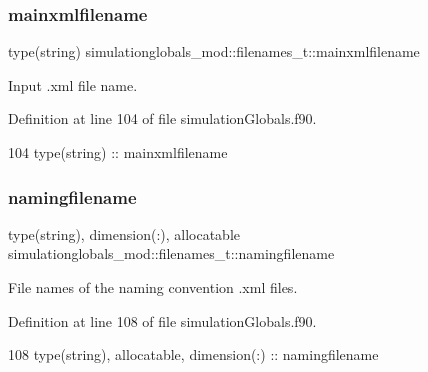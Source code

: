 \subsubsection{\texorpdfstring{mainxmlfilename}{mainxmlfilename}}
{\footnotesize\ttfamily type(string) simulationglobals\+\_\+mod\+::filenames\+\_\+t\+::mainxmlfilename\hspace{0.3cm}{\ttfamily [private]}}



Input .xml file name. 



Definition at line 104 of file simulation\+Globals.\+f90.


\begin{DoxyCode}
104         \textcolor{keywordtype}{type}(string) :: mainxmlfilename
\end{DoxyCode}
\mbox{\label{structsimulationglobals__mod_1_1filenames__t_ab9bfe3490032ac0fe0ff585f4ccf81ba}} 
\subsubsection{\texorpdfstring{namingfilename}{namingfilename}}
{\footnotesize\ttfamily type(string), dimension(\+:), allocatable simulationglobals\+\_\+mod\+::filenames\+\_\+t\+::namingfilename\hspace{0.3cm}{\ttfamily [private]}}



File names of the naming convention .xml files. 



Definition at line 108 of file simulation\+Globals.\+f90.


\begin{DoxyCode}
108         \textcolor{keywordtype}{type}(string), \textcolor{keywordtype}{allocatable}, \textcolor{keywordtype}{dimension(:)} :: namingfilename
\end{DoxyCode}
\mbox{\label{structsimulationglobals__mod_1_1filenames__t_aa8af9fb10dcd5d2f5dfc0fe299a16755}} 
